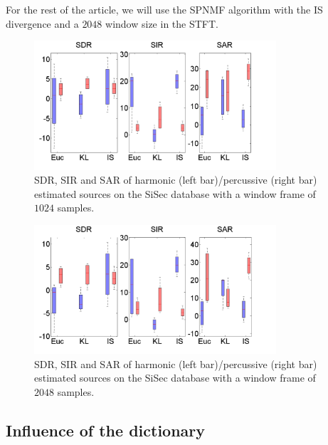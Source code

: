 \documentclass[journal]{IEEEtran}
\begin{document}
For the rest of the article, we will use the SPNMF algorithm with the IS divergence and a $2048$ window size in the STFT.


\begin{figure}[htb]

  \centering 
  \includegraphics[width=9cm]{fig/DivergenceFrame1024.png}
  \caption{\label{frame1024} SDR, SIR and SAR of harmonic (left bar)/percussive (right bar) estimated sources on the SiSec database with a window frame of $1024$ samples.}
  
\end{figure}


\begin{figure}[htb]

  \centering 
  \includegraphics[width=9cm]{fig/DivergenceFrame2048.png}
  \caption{\label{frame2048} SDR, SIR and SAR of harmonic (left bar)/percussive (right bar) estimated sources on the SiSec database with a window frame of $2048$ samples.}
  
\end{figure}



\subsection{Influence of the dictionary}\label{setup:dictionary}
\end{document}
